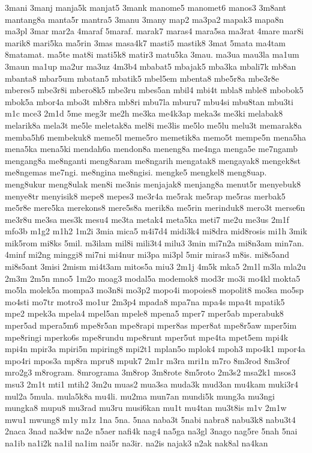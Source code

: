 {3mani 3manj manja5k manjat5 3mank manome5 manomet6 manos3 3m8ant mantang8a
manta5r mantra5 3manu 3many map2 ma3pa2 mapak3 mapa8n ma3pl 3mar mar2a
4maraf 5maraf. marak7 maras4 mara5sa ma3rat 4mare mar8i marik8 mari5ka
ma5rin 3mas masa4k7 masti5 mastik8 3mat 5mata ma4tam 8matamat. ma5te mat8i
mati5k8 matir3 matu5ka 3mau. ma3ua mau3la ma1um 3maun ma1up ma2ur ma3uz
4m3b4 mbabat5 mbajak5 mba3ka mbali7k mb8an mbanta8 mbar5um mbatan5 mbatik5
mbel5em mbenta8 mbe5r8a mbe3r8e mberes5 mbe3r8i mbero8k5 mbe3ru mbes5an
mbil4 mbi4t mbla8 mble8 mbobok5 mbok5a mbor4a mbo3t mb8ra mb8ri mbu7la
mburu7 mbu4si mbu8tan mbu3ti m1c mce3 2m1d 5me meg3r me2h me3ka me4k3ap
meka3s me3ki melabak8 melarik8a mela3t me5le meletak8a mel8i me3lis me5lo
me5lu melu3t memarak8a memba5h6 membekuk8 meme5l meme5ro memetik8a memo5t
mempe5n mena5ha mena5ka mena5ki mendah6a mendon8a meneng8a me4nga menga5e
me7ngamb mengang8a me8nganti meng8aram me8ngarih mengatak8 mengayak8
mengek8st me8ngemas me7ngi. me8ngina me8ngisi. mengke5 mengkel8 meng8uap.
meng8ukur meng8ulak men8i me3nis menjajak8 menjang8a menut5r menyebuk8
menye8tr menyisik8 mepe8 mepes3 me3r4a me5rak me5rap me5ras merbak5 me5r8e
mere5ka merekons8 mere5s8a merik8a me5rin merinduk8 mero3t merse6n me3r8u
me3sa mes3k mesu4 me3ta metak4 meta5ka meti7 me2u me3us 2m1f mfo3b m1g2
m1h2 1m2i 3mia mica5 m4i7d4 midi3k4 mi8dra mid8rosis mi1h 3mik mik5rom
mi8ks 5mil. m3ilam mil8i mili3t4 milu3 3min mi7n2a mi8n3am min7an. 4minf
mi2ng minggi8 mi7ni mi4nur mi3pa mi3pl 5mir miras3 m8is. mi8s5and mi8s5ant
3misi 2mism mi4t3am mitos5a miu3 2m1j 4m5k mka5 2m1l m3la mla2u 2m3m 2m5n
mno5 1m2o moag3 modal5a modemok8 mod3r mo3i mo4kl mokta5 mo5la molek5a
mompa3 mo3n8i mo3p2 mopo4i mopoies8 mopolit8 mo3sa mo5sp mo4sti mo7tr
motro3 mo1ur 2m3p4 mpada8 mpa7na mpa4s mpa4t mpatik5 mpe2 mpek3a mpela4
mpel5an mpele8 mpena5 mper7 mper5ab mperabuk8 mper5ad mpera5m6 mpe8r5an
mpe8rapi mper8as mper8at mpe8r5aw mper5im mpe8ringi mperko6s mpe8rundu
mpe8runt mper5ut mpe4ta mpet5em mpi4k mpi4n mpir3a mpiri5n mpiring8 mpi2t1
mplan5o mplok4 mpoh3 mpo4k1 mpor4a mpo4ri mpos3a mp8ra mpru8 mpuk7 2m1r
m3ra mri1n m7ro 8m3rod 8m3rof mro2g3 m8rogram. 8mrograma 3m8rop 3m8rote
8m5roto 2m3s2 msa2k1 msos3 msu3 2m1t mti1 mtih2 3m2u muas2 mua3sa muda3k
mud3an mu4kam muki3r4 mul2a 5mula. mula5k8a mu4li. mu2ma mun7an mundi5k
mung3a mu3ngi mungka8 mupu8 mu3rad mu3ru musi6kan mu1t mu4tan mu3t8is m1v
2m1w mwu1 mwung8 m1y m1z 1na 5na. 5naa naba3t 5nabi nabra8 nabu3k8 nabu3t4
2naca 3nad na3dw na2e n5aer nafi4k nag4 na5ga na3gl 3nago nag5re 5nah 5nai
na1ib na1i2k na1il na1im nai5r na3ir. na2is najak3 n2ak nak8al na4kan
}
